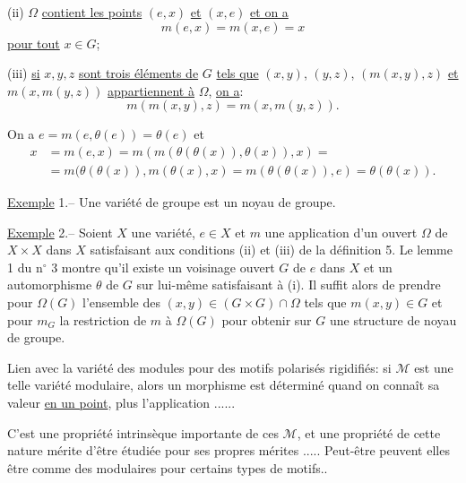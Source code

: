 (ii) $\Omega$ \uline{contient les points} $(e,x)$ \uline{et} $(x,e)$ \uline{et on a}
\[
\tag{37}m(e,x)=m(x,e)=x
\]
\uline{pour tout} $x\in G$;

(iii) \uline{si} $x,y,z$ \uline{sont trois éléments de} $G$ \uline{tels que} $(x,y)$, $(y,z)$, $(m(x,y),z)$ \uline{et} $m(x,m(y,z))$ \uline{appartiennent à} $\Omega$, \uline{on a}:
\[
\tag{38}m(m(x,y),z)=m(x,m(y,z)).
\]

On a $e=m(e,\theta(e))=\theta(e)$ et
\[
\begin{aligned}
x&=m(e,x)=m(m(\theta(\theta(x)),\theta(x)),x)=\\
&=m(\theta(\theta(x)),m(\theta(x),x)=m(\theta(\theta(x)),e)=\theta(\theta(x)).
\end{aligned}
\]

\uline{Exemple} 1.-- Une variété de groupe est un noyau de groupe.

\uline{Exemple} 2.-- Soient $X$ une variété, $e\in X$ et $m$ une application d'un ouvert $\Omega$ de $X\times X$ dans $X$ satisfaisant aux conditions (ii) et (iii) de la définition 5.
Le lemme 1 du n$^\circ$ 3 montre qu'il existe un voisinage ouvert $G$ de $e$ dans $X$ et un automorphisme $\theta$ de $G$ sur lui-même satisfaisant à (i).
Il suffit alors de prendre pour $\Omega(G)$ l'ensemble des $(x,y)\in(G\times G)\cap\Omega$ tels que $m(x,y)\in G$ et pour $m_G$ la restriction de $m$ à $\Omega(G)$ pour obtenir sur $G$ une structure de noyau de groupe.

Lien avec la variété des modules pour des motifs polarisés rigidifiés:
si  $\mathcal M$ est une telle variété modulaire, alors un morphisme
est déterminé quand on connaît sa valeur \uline{en un point}, plus l'application
......

C'est une propriété intrinsèque importante de ces $\mathcal M$, et une propriété de cette nature mérite d'être étudiée pour ses propres mérites .....
Peut-être peuvent elles  être
comme des  modulaires pour certains types de motifs..



